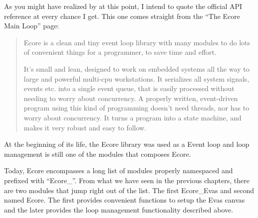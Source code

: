 \documentclass[12pt,a4paper,english]{book}
\begin{document}
As you might have realized by at this point, I intend to quote the official API
reference at every chance I get. This one comes straight from the ``The Ecore
Main Loop'' page:
\begin{quote}

Ecore is a clean and tiny event loop library with many modules to do lots
of convenient things for a programmer, to save time and effort.

It's small and lean, designed to work on embedded systems all the way to
large and powerful multi-cpu workstations. It serializes all system
signals, events etc. into a single event queue, that is easily processed
without needing to worry about concurrency. A properly written,
event-driven program using this kind of programming doesn't need threads,
nor has to worry about concurrency. It turns a program into a state
machine, and makes it very robust and easy to follow.
\end{quote}

At the beginning of its life, the Ecore library was used as a Event loop and
loop management is still one of the modules that composes Ecore.

{\hfill{}\hfill}

Today, Ecore encompasses a long list of modules properly namespaced and
prefixed with ``Ecore{\_}''. From what we have seen in the previous chapters, there
are two modules that jump right out of the list. The first Ecore{\_}Evas and
second named Ecore. The first provides convenient functions to setup the Evas
canvas and the later provides the loop management functionality described
above.
\end{document}
